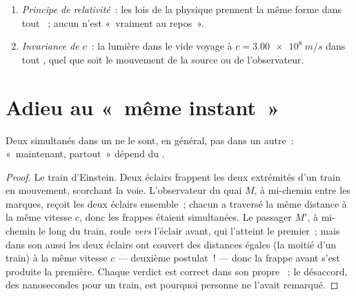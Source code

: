 \begin{theorem}\label{thm:g12:special-relativity:postulates}
\begin{enumerate}
  \item \emph{Principe de relativité}~: les lois de la physique
        prennent la même forme dans tout
        ~; aucun n'est
        «~vraiment au repos~».
  \item \emph{Invariance de $c$}~: la lumière dans le vide voyage à
        $c = \qty{3.00e8}{m/s}$ dans tout
        , quel que soit le
        mouvement de la source ou de l'observateur.
\end{enumerate}
\end{theorem}
\admitted

\section{Adieu au «~même instant~»}

\begin{proposition}\label{prop:g12:special-relativity:simultaneity}
Deux  simultanés dans un
 ne le sont, en général, pas
dans un autre~: «~maintenant, partout~» dépend du .
\end{proposition}

\begin{proof}
Le train d'Einstein. Deux éclairs frappent les deux extrémités d'un
train en mouvement, scorchant la voie. L'observateur du quai $M$, à
mi-chemin entre les marques, reçoit les deux éclairs ensemble~;
chacun a traversé la même distance à la même vitesse $c$, donc les
frappes étaient simultanées. Le passager $M'$, à mi-chemin le long
du train, roule \emph{vers} l'éclair avant, qui l'atteint le
premier~; mais dans son  aussi les deux éclairs ont
couvert des distances égales (la moitié d'un train) à la même
vitesse $c$ --- deuxième postulat~! --- donc la frappe avant s'est
produite la première. Chaque verdict est correct dans son propre
~; le désaccord, des nanosecondes pour un train, est
pourquoi personne ne l'avait remarqué.
\end{proof}

